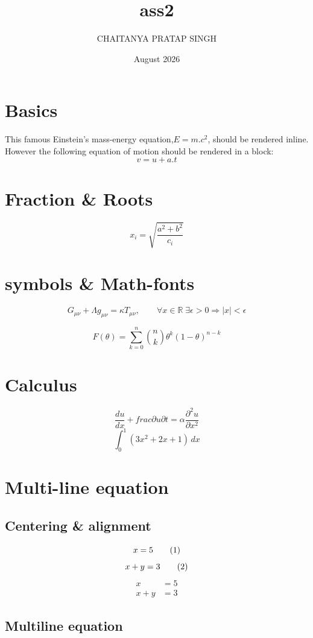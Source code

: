 \documentclass{article}
\title{ass2}
\author{CHAITANYA PRATAP SINGH}
\date{August 2026}
\begin{document}
\section{Basics}

This famous Einstein’s mass-energy equation,\(E = m.c^2\), should be rendered inline.
However the following equation of motion should be rendered in a block: 
\[v = u + a.t\]

\section{Fraction \& Roots}

\[x_i = \sqrt{\frac{a^2+b^2}{c_i}}\]

\section{symbols \& Math-fonts}

\[G_{\mu\nu} + \Lambda g_{\mu\nu} = \kappa T_{\mu\nu},\qquad \forall x \in \mathbb{R}\; \exists \epsilon > 0 \Rightarrow |x|<\epsilon\]

\[F(\theta) = \sum_{k=0}^{n}\binom{n}{k}\theta^k(1-\theta)^{n-k}\]

\section{Calculus}

\[\frac{du}{dx} + frac{\partial u}{\partial t} = \alpha\frac{\partial^2 u}{\partial x^2}\]
\[\int_0^1(3x^2 + 2x + 1)\,dx\]

\section{Multi-line equation}

\subsection{Centering \& alignment}
\[x = 5 \tag{1}\\\]
\[ x+y = 3 \tag{2}\\\]
\begin{align}
x &= 5 \tag{3}\\
x+y &= 3 \tag{4}
\end{align}

\subsection{Multiline equation}
\end{document}
